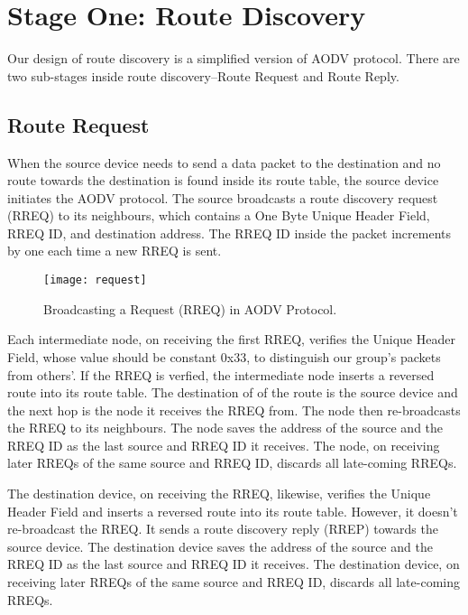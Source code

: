 \section{Stage One: Route Discovery}
\label{sec:design-aodv}
Our design of route discovery is a simplified version of AODV protocol. There are two sub-stages inside route discovery--Route Request and Route Reply.

\subsection{Route Request}

When the source device needs to send a data packet to the destination and no route towards the destination is found inside its route table, the source device initiates the AODV protocol.
The source broadcasts a route discovery request (RREQ) to its neighbours, which contains a One Byte Unique Header Field, RREQ ID, and destination address.
The RREQ ID inside the packet increments by one each time a new RREQ is sent.

\begin{figure}
\centering
\texttt{[image: request]}
\caption{Broadcasting a Request (RREQ) in AODV Protocol.}
\label{fig:request}
\end{figure}

Each intermediate node, on receiving the first RREQ, verifies the Unique Header Field, whose value should be constant 0x33, to distinguish our group's packets from others'.
If the RREQ is verfied, the intermediate node inserts a reversed route into its route table. The destination of of the route is the source device and the next hop is the node it receives the RREQ from.
The node then re-broadcasts the RREQ to its neighbours.
The node saves the address of the source and the RREQ ID as the last source and RREQ ID it receives.
The node, on receiving later RREQs of the same source and RREQ ID, discards all late-coming RREQs.


The destination device, on receiving the RREQ, likewise, verifies the Unique Header Field and inserts a reversed route into its route table.
However, it doesn't re-broadcast the RREQ.
It sends a route discovery reply (RREP) towards the source device.
The destination device saves the address of the source and the RREQ ID as the last source and RREQ ID it receives.
The destination device, on receiving later RREQs of the same source and RREQ ID, discards all late-coming RREQs.



